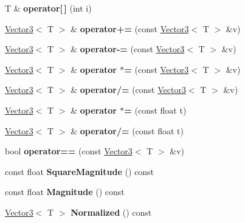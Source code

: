 \begin{DoxyCompactItemize}
T \& {\bfseries operator\mbox{[}$\,$\mbox{]}} (int i)
\item 
\mbox{\label{class_vector3_a0bc5cd207aa5666973246dd002d856f0}} 
\mbox{\hyperlink{class_vector3}{Vector3}}$<$ T $>$ \& {\bfseries operator+=} (const \mbox{\hyperlink{class_vector3}{Vector3}}$<$ T $>$ \&v)
\item 
\mbox{\label{class_vector3_a5f8e3dfb7d3ecfc4e778c6028eccd174}} 
\mbox{\hyperlink{class_vector3}{Vector3}}$<$ T $>$ \& {\bfseries operator-\/=} (const \mbox{\hyperlink{class_vector3}{Vector3}}$<$ T $>$ \&v)
\item 
\mbox{\label{class_vector3_aee3ec3bf142214401d8255daea6490fc}} 
\mbox{\hyperlink{class_vector3}{Vector3}}$<$ T $>$ \& {\bfseries operator $\ast$=} (const \mbox{\hyperlink{class_vector3}{Vector3}}$<$ T $>$ \&v)
\item 
\mbox{\label{class_vector3_ace1035256e3237ac7817f778419d0f80}} 
\mbox{\hyperlink{class_vector3}{Vector3}}$<$ T $>$ \& {\bfseries operator/=} (const \mbox{\hyperlink{class_vector3}{Vector3}}$<$ T $>$ \&v)
\item 
\mbox{\label{class_vector3_a1064f9d5baad6c7e47124f53fa3f1efc}} 
\mbox{\hyperlink{class_vector3}{Vector3}}$<$ T $>$ \& {\bfseries operator $\ast$=} (const float t)
\item 
\mbox{\label{class_vector3_adaefbf57789066f0d88393533e013277}} 
\mbox{\hyperlink{class_vector3}{Vector3}}$<$ T $>$ \& {\bfseries operator/=} (const float t)
\item 
\mbox{\label{class_vector3_a306a028b0edcbbb511ff2a6ed0b58430}} 
bool {\bfseries operator==} (const \mbox{\hyperlink{class_vector3}{Vector3}}$<$ T $>$ \&v)
\item 
\mbox{\label{class_vector3_aedd436b21d3dfe352d11d6c7c8c0b4ab}} 
const float {\bfseries Square\+Magnitude} () const
\item 
\mbox{\label{class_vector3_a882289ea267a87c8a7cebd58a05befff}} 
const float {\bfseries Magnitude} () const
\item 
\mbox{\label{class_vector3_a84516fbb123d0a06302f080771926539}} 
\mbox{\hyperlink{class_vector3}{Vector3}}$<$ T $>$ {\bfseries Normalized} () const
\end{DoxyCompactItemize}
